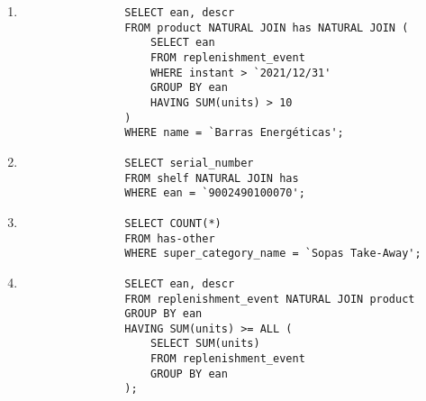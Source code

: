 \documentclass{article}
\begin{document}
	\begin{enumerate}[label=\arabic*)]
		\item
			\begin{verbatim}
				SELECT ean, descr
				FROM product NATURAL JOIN has NATURAL JOIN (
				    SELECT ean
				    FROM replenishment_event
				    WHERE instant > `2021/12/31'
				    GROUP BY ean
				    HAVING SUM(units) > 10
				)
				WHERE name = `Barras Energéticas';
			\end{verbatim}

		\vspace{5mm}

		\item
			\begin{verbatim}
				SELECT serial_number
				FROM shelf NATURAL JOIN has
				WHERE ean = `9002490100070';
			\end{verbatim}

		\vspace{5mm}

		\item
			\begin{verbatim}
				SELECT COUNT(*)
				FROM has-other
				WHERE super_category_name = `Sopas Take-Away';
			\end{verbatim}

		\vspace{5mm}

		\item
			\begin{verbatim}
				SELECT ean, descr
				FROM replenishment_event NATURAL JOIN product
				GROUP BY ean
				HAVING SUM(units) >= ALL (
				    SELECT SUM(units)
				    FROM replenishment_event
				    GROUP BY ean
				);
			\end{verbatim}
	\end{enumerate}
\end{document}
